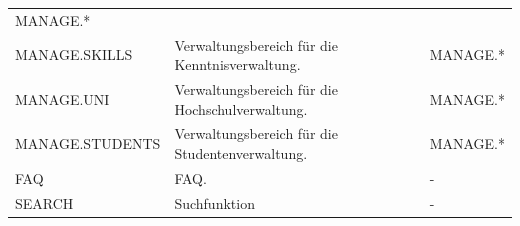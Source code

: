 \documentclass[
  12pt,
  ngerman,
  a4paper,
]{article}
\begin{document}
\begin{longtable}[]{@{}lll@{}}
\begin{minipage}[t]{0.28\columnwidth}
MANAGE.*\strut
\end{minipage}\tabularnewline
\begin{minipage}[t]{0.27\columnwidth}\raggedright
MANAGE.SKILLS\strut
\end{minipage} & \begin{minipage}[t]{0.35\columnwidth}\raggedright
Verwaltungsbereich für die Kenntnisverwaltung.\strut
\end{minipage} & \begin{minipage}[t]{0.28\columnwidth}\raggedright
MANAGE.*\strut
\end{minipage}\tabularnewline
\begin{minipage}[t]{0.27\columnwidth}\raggedright
MANAGE.UNI\strut
\end{minipage} & \begin{minipage}[t]{0.35\columnwidth}\raggedright
Verwaltungsbereich für die Hochschulverwaltung.\strut
\end{minipage} & \begin{minipage}[t]{0.28\columnwidth}\raggedright
MANAGE.*\strut
\end{minipage}\tabularnewline
\begin{minipage}[t]{0.27\columnwidth}\raggedright
MANAGE.STUDENTS\strut
\end{minipage} & \begin{minipage}[t]{0.35\columnwidth}\raggedright
Verwaltungsbereich für die Studentenverwaltung.\strut
\end{minipage} & \begin{minipage}[t]{0.28\columnwidth}\raggedright
MANAGE.*\strut
\end{minipage}\tabularnewline
\begin{minipage}[t]{0.27\columnwidth}\raggedright
FAQ\strut
\end{minipage} & \begin{minipage}[t]{0.35\columnwidth}\raggedright
FAQ.\strut
\end{minipage} & \begin{minipage}[t]{0.28\columnwidth}\raggedright
-\strut
\end{minipage}\tabularnewline
\begin{minipage}[t]{0.27\columnwidth}\raggedright
SEARCH\strut
\end{minipage} & \begin{minipage}[t]{0.35\columnwidth}\raggedright
Suchfunktion\strut
\end{minipage} & \begin{minipage}[t]{0.28\columnwidth}\raggedright
-\strut
\end{minipage}\tabularnewline
\bottomrule
\end{longtable}
\end{document}
